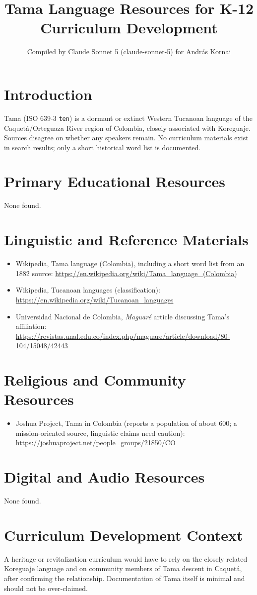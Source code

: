 \documentclass[12pt]{article}
\title{Tama Language Resources for K-12 Curriculum Development}
\author{Compiled by Claude Sonnet 5 (claude-sonnet-5) for Andr\'as Kornai}
\date{}
\begin{document}
\maketitle
\section{Introduction}
Tama (ISO 639-3 \texttt{ten}) is a dormant or extinct Western Tucanoan language of the Caquetá/Orteguaza River region of Colombia, closely associated with Koreguaje. Sources disagree on whether any speakers remain. No curriculum materials exist in search results; only a short historical word list is documented.
\section{Primary Educational Resources}
None found.
\section{Linguistic and Reference Materials}
\begin{itemize}
\item Wikipedia, Tama language (Colombia), including a short word list from an 1882 source: \url{https://en.wikipedia.org/wiki/Tama_language_(Colombia)}
\item Wikipedia, Tucanoan languages (classification): \url{https://en.wikipedia.org/wiki/Tucanoan_languages}
\item Universidad Nacional de Colombia, \emph{Maguar\'e} article discussing Tama's affiliation: \url{https://revistas.unal.edu.co/index.php/maguare/article/download/80-104/15048/42443}
\end{itemize}
\section{Religious and Community Resources}
\begin{itemize}
\item Joshua Project, Tama in Colombia (reports a population of about 600; a mission-oriented source, linguistic claims need caution): \url{https://joshuaproject.net/people_groups/21850/CO}
\end{itemize}
\section{Digital and Audio Resources}
None found.
\section{Curriculum Development Context}
A heritage or revitalization curriculum would have to rely on the closely related Koreguaje language and on community members of Tama descent in Caquetá, after confirming the relationship. Documentation of Tama itself is minimal and should not be over-claimed.
\end{document}

